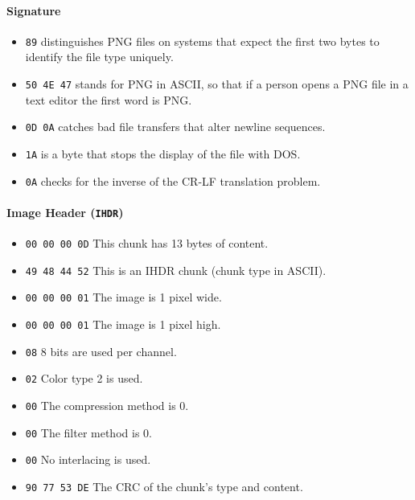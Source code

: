 \documentclass[runningheads]{llncs}
\begin{document}
\paragraph{Signature}
\begin{itemize}
    \item \texttt{{\color{NavyBlue}89}} distinguishes PNG files on systems that expect the first two bytes to identify the file type uniquely.
    \item \texttt{{\color{NavyBlue}50 4E 47}} stands for PNG in ASCII, so that if a person opens a PNG file in a text editor the first word is PNG.
    \item \texttt{{\color{NavyBlue}0D 0A}} catches bad file transfers that alter newline sequences.
    \item \texttt{{\color{NavyBlue}1A}} is a byte that stops the display of the file with DOS.
    \item \texttt{{\color{NavyBlue}0A}} checks for the inverse of the CR-LF translation problem.

\end{itemize}

\paragraph{Image Header (\texttt{IHDR})}
\begin{itemize}
    \item \texttt{\color{PineGreen}00 00 00 0D} This chunk has 13 bytes of content.
    \item \texttt{\color{PineGreen}49 48 44 52} This is an IHDR chunk (chunk type in ASCII).
    \item \texttt{\color{PineGreen}00 00 00 01} The image is 1 pixel wide.
    \item \texttt{\color{PineGreen}00 00 00 01} The image is 1 pixel high.
    \item \texttt{\color{PineGreen}08} 8 bits are used per channel.
    \item \texttt{\color{PineGreen}02} Color type 2 is used.
    \item \texttt{\color{PineGreen}00} The compression method is 0.
    \item \texttt{\color{PineGreen}00} The filter method is 0.
    \item \texttt{\color{PineGreen}00} No interlacing is used.
    \item \texttt{\color{PineGreen}90 77 53 DE} The CRC of the chunk's type and content.
\end{itemize}
\end{document}
